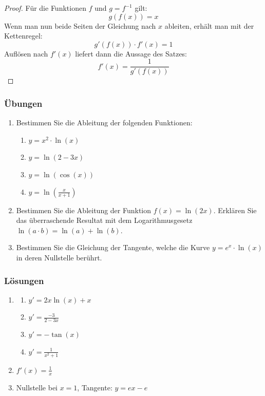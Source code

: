 \begin{proof}
    Für die Funktionen $f$ und $g=f^{-1}$ gilt:
    $$ g(f(x)) = x$$
    Wenn man nun beide Seiten der Gleichung nach $x$ ableiten, erhält man mit der Kettenregel:
    $$ g'(f(x)) \cdot f'(x) = 1$$
    Auflösen nach $f'(x)$ liefert dann die Aussage des Satzes:
    $$f'(x) = \frac{1}{g'(f(x))}$$
\end{proof}

\clearpage
\subsubsection{Übungen}
\begin{enumerate}
    \item Bestimmen Sie die Ableitung der folgenden Funktionen:
          \begin{enumerate}
              \item $y= x^2 \cdot \ln(x)$
              \item $y= \ln(2-3x)$
              \item $y=\ln(\cos(x))$
              \item $y= \ln\left(\frac{x}{x+1}\right)$


          \end{enumerate}
    \item Bestimmen Sie die Ableitung der Funktion $f(x) = \ln(2x)$. Erklären Sie das überraschende Resultat mit dem Logarithmusgesetz $\ln(a\cdot b) = \ln(a) + \ln(b)$.
    \item Bestimmen Sie die Gleichung der Tangente, welche die Kurve $y=e^x\cdot \ln(x)$ in deren Nullstelle berührt.
\end{enumerate}
\clearpage
\subsubsection*{Lösungen}
\begin{enumerate}
    \item
          \begin{enumerate}
              \item $y' = 2x \ln(x) + x$
              \item $y'= \frac{-3}{2-3x}$
              \item $y'= -\tan(x)$
              \item $y'= \frac{1}{x^2+1}$


          \end{enumerate}
    \item $f'(x) = \frac{1}{x}$
    \item Nullstelle bei $x=1$, Tangente: $y= ex-e$
\end{enumerate}
\clearpage
